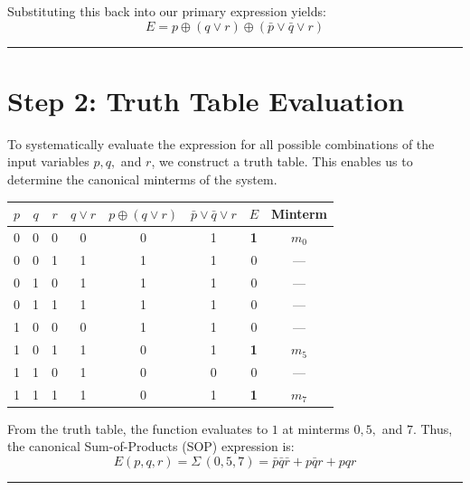 \documentclass[12pt,a3paper]{article}
\begin{document}
\begin{enumerate}
\begin{tcolorbox}[enhanced,breakable,ansbox,colback=cA!4,colframe=cA,boxrule=0.8pt,arc=5pt,title={\textbf{Answer}},fonttitle=\bfseries\color{white},colbacktitle=cA]
Substituting this back into our primary expression yields:
\begin{equation}
    E = p \oplus (q \vee r) \oplus (\bar{p} \vee \bar{q} \vee r)
\end{equation}

\vspace{0.2cm}
\hrule
\vspace{0.4cm}

\section*{Step 2: Truth Table Evaluation}

To systematically evaluate the expression for all possible combinations of the input variables $p, q,$ and $r$, we construct a truth table. This enables us to determine the canonical minterms of the system.

\begin{center}
\begin{tabular}{cccccccc}
    \toprule
    $p$ & $q$ & $r$ & $q \vee r$ & $p \oplus (q \vee r)$ & $\bar{p} \vee \bar{q} \vee r$ & $E$ & Minterm \\
    \midrule
    0 & 0 & 0 & 0 & 0 & 1 & \textbf{\textcolor{cA}{1}} & $m_0$ \\
    0 & 0 & 1 & 1 & 1 & 1 & 0 & — \\
    0 & 1 & 0 & 1 & 1 & 1 & 0 & — \\
    0 & 1 & 1 & 1 & 1 & 1 & 0 & — \\
    1 & 0 & 0 & 0 & 1 & 1 & 0 & — \\
    1 & 0 & 1 & 1 & 0 & 1 & \textbf{\textcolor{cA}{1}} & $m_5$ \\
    1 & 1 & 0 & 1 & 0 & 0 & 0 & — \\
    1 & 1 & 1 & 1 & 0 & 1 & \textbf{\textcolor{cA}{1}} & $m_7$ \\
    \bottomrule
\end{tabular}
\end{center}

From the truth table, the function evaluates to $1$ at minterms $0, 5,$ and $7$. Thus, the canonical Sum-of-Products (SOP) expression is:
\begin{equation}
    E(p, q, r) = \Sigma\,(0, 5, 7) = \bar{p}\bar{q}\bar{r} + p\bar{q}r + pqr
\end{equation}

\vspace{0.2cm}
\hrule
\vspace{0.4cm}


\end{tcolorbox}
\end{enumerate}
\end{document}
